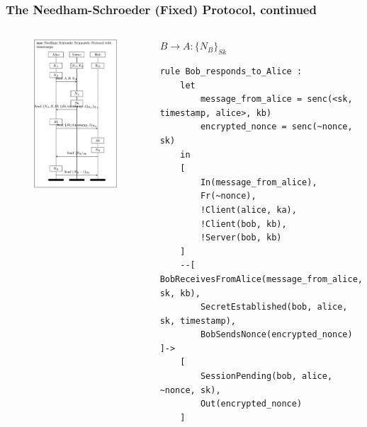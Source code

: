 \documentclass[aspectratio=169,t,xcolor=table]{beamer}
\begin{document}
\begin{frame}[fragile]
    \frametitle{The Needham-Schroeder (Fixed) Protocol, continued}
    \begin{columns}
        \begin{figure}
            \centering
            \includegraphics[width=.8\textwidth]{images/NS_Fixed.png}
        \end{figure}
        \begin{block}{$B \to A: \{N_B\}_{Sk}$}
            \begin{lstlisting}[language=Tamarin]
rule Bob_responds_to_Alice :
    let
        message_from_alice = senc(<sk, timestamp, alice>, kb)
        encrypted_nonce = senc(~nonce, sk)
    in
    [
        In(message_from_alice),
        Fr(~nonce),
        !Client(alice, ka),
        !Client(bob, kb),
        !Server(bob, kb)
    ]
    --[ BobReceivesFromAlice(message_from_alice, sk, kb),
        SecretEstablished(bob, alice, sk, timestamp),
        BobSendsNonce(encrypted_nonce) ]->
    [
        SessionPending(bob, alice, ~nonce, sk),
        Out(encrypted_nonce)
    ]\end{lstlisting}
        \end{block}
    \end{columns}
\end{frame}
\end{document}
